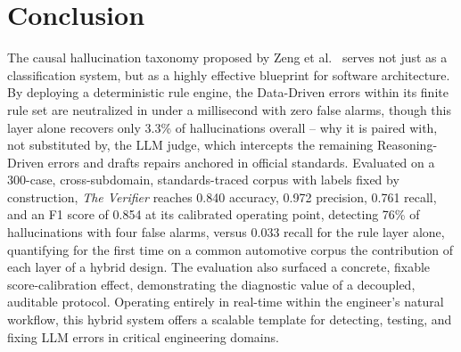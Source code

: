 \documentclass[conference,a4paper]{IEEEtran}
\begin{document}
\section{Conclusion}
The causal hallucination taxonomy proposed by Zeng et al.~\cite{ref14} serves not just as a classification system, but as a highly effective blueprint for software architecture. By deploying a deterministic rule engine, the Data-Driven errors within its finite rule set are neutralized in under a millisecond with zero false alarms, though this layer alone recovers only 3.3\% of hallucinations overall -- why it is paired with, not substituted by, the LLM judge, which intercepts the remaining Reasoning-Driven errors and drafts repairs anchored in official standards. Evaluated on a 300-case, cross-subdomain, standards-traced corpus with labels fixed by construction, \textit{The Verifier} reaches 0.840 accuracy, 0.972 precision, 0.761 recall, and an F1 score of 0.854 at its calibrated operating point, detecting 76\% of hallucinations with four false alarms, versus 0.033 recall for the rule layer alone, quantifying for the first time on a common automotive corpus the contribution of each layer of a hybrid design. The evaluation also surfaced a concrete, fixable score-calibration effect, demonstrating the diagnostic value of a decoupled, auditable protocol. Operating entirely in real-time within the engineer's natural workflow, this hybrid system offers a scalable template for detecting, testing, and fixing LLM errors in critical engineering domains.
\end{document}
